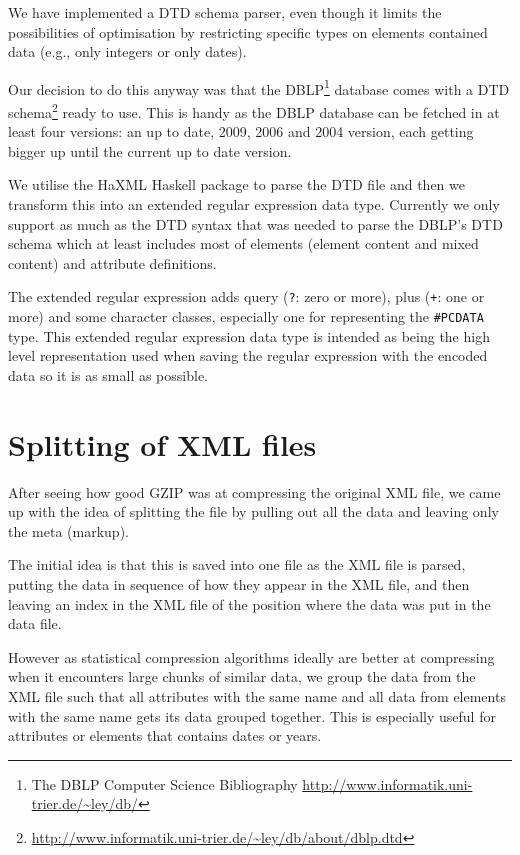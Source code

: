 \documentclass[a4paper, oneside]{memoir}
\theoremstyle{definition}
\begin{document}
We have implemented a DTD schema parser, even though it limits the possibilities
of optimisation by restricting specific types on elements contained data (e.g.,
only integers or only dates).

Our decision to do this anyway was that the DBLP\footnote{The DBLP Computer
  Science Bibliography \url{http://www.informatik.uni-trier.de/~ley/db/}}
database comes with a DTD
schema\footnote{\url{http://www.informatik.uni-trier.de/~ley/db/about/dblp.dtd}}
ready to use. This is handy as the DBLP database can be fetched in at least four
versions: an up to date, 2009, 2006 and 2004 version, each getting bigger
up until the current up to date version.

We utilise the HaXML Haskell package to parse the DTD file and then we transform
this into an extended regular expression data type. Currently we only support as
much as the DTD syntax that was needed to parse the DBLP's DTD schema which at
least includes most of elements (element content and mixed content) and
attribute definitions.

The extended regular expression adds query (\texttt{?}: zero or more), plus
(\texttt{+}: one or more) and some character classes, especially one for
representing the \texttt{\#PCDATA} type. This extended regular expression data
type is intended as being the high level representation used when saving the
regular expression with the encoded data so it is as small as possible.

\section{Splitting of XML files}
\label{sec:splitting-xml-files}

After seeing how good GZIP was at compressing the original XML file, we came up
with the idea of splitting the file by pulling out all the data and leaving only
the meta (markup).

The initial idea is that this is saved into one file as the XML file is parsed,
putting the data in sequence of how they appear in the XML file, and then
leaving an index in the XML file of the position where the data was put in the
data file.

However as statistical compression algorithms ideally are better at compressing
when it encounters large chunks of similar data, we group the data from the XML
file such that all attributes with the same name and all data from elements with
the same name gets its data grouped together. This is especially useful for
attributes or elements that contains dates or years.
\end{document}
